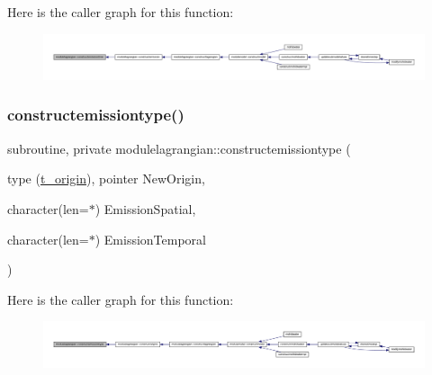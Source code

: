 Here is the caller graph for this function\+:\nopagebreak
\begin{figure}[H]
\begin{center}
\leavevmode
\includegraphics[width=350pt]{namespacemodulelagrangian_aeeff0dc876b075a641427da62012e39e_icgraph}
\end{center}
\end{figure}
\mbox{\label{namespacemodulelagrangian_a647212013ee98b692308121cf19b0e90}} 
\subsubsection{\texorpdfstring{constructemissiontype()}{constructemissiontype()}}
{\footnotesize\ttfamily subroutine, private modulelagrangian\+::constructemissiontype (\begin{DoxyParamCaption}\item[{type (\mbox{\hyperlink{structmodulelagrangian_1_1t__origin}{t\+\_\+origin}}), pointer}]{New\+Origin,  }\item[{character(len=$\ast$)}]{Emission\+Spatial,  }\item[{character(len=$\ast$)}]{Emission\+Temporal }\end{DoxyParamCaption})\hspace{0.3cm}{\ttfamily [private]}}

Here is the caller graph for this function\+:\nopagebreak
\begin{figure}[H]
\begin{center}
\leavevmode
\includegraphics[width=350pt]{namespacemodulelagrangian_a647212013ee98b692308121cf19b0e90_icgraph}
\end{center}
\end{figure}
\mbox{\label{namespacemodulelagrangian_aadb63f9fca438cc41d82d25d4e841aa6}} 
